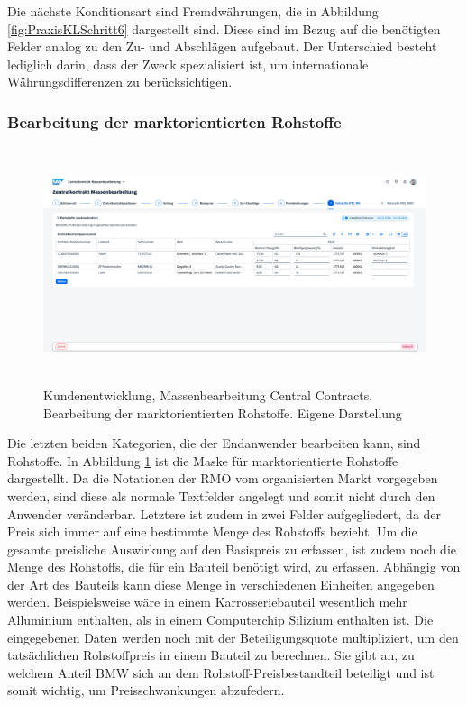 Die nächste Konditionsart sind Fremdwährungen, die in Abbildung \ref{fig:PraxisKLSchritt6} dargestellt sind. Diese sind im Bezug auf die benötigten Felder analog zu den Zu- und Abschlägen aufgebaut. Der Unterschied besteht lediglich darin, dass der Zweck spezialisiert ist, um internationale Währungsdifferenzen zu berücksichtigen.

\subsubsection{Bearbeitung der marktorientierten Rohstoffe}

\begin{figure}[H]
    \centering
    \includegraphics[height=6.91cm]{Bilder/Praxisteil-KL-Schritt-7.png}
    \caption[Kundenentwicklung, Massenbearbeitung Central Contracts, Bearbeitung der marktorientierten Rohstoffe]{Kundenentwicklung, Massenbearbeitung Central Contracts, Bearbeitung der marktorientierten Rohstoffe. Eigene Darstellung}
    \label{fig:PraxisKLSchritt7}
\end{figure}

Die letzten beiden Kategorien, die der Endanwender bearbeiten kann, sind Rohstoffe. In Abbildung \ref{fig:PraxisKLSchritt7} ist die Maske für marktorientierte Rohstoffe dargestellt. Da die Notationen der RMO vom organisierten Markt vorgegeben werden, sind diese als normale Textfelder angelegt und somit nicht durch den Anwender veränderbar. Letztere ist zudem in zwei Felder aufgegliedert, da der Preis sich immer auf eine bestimmte Menge des Rohstoffs bezieht. Um die gesamte preisliche Auswirkung auf den Basispreis zu erfassen, ist zudem noch die Menge des Rohstoffs, die für ein Bauteil benötigt wird, zu erfassen. Abhängig von der Art des Bauteils kann diese Menge in verschiedenen Einheiten angegeben werden. Beispielsweise wäre in einem Karrosseriebauteil wesentlich mehr Alluminium enthalten, als in einem Computerchip Silizium enthalten ist. Die eingegebenen Daten werden noch mit der Beteiligungsquote multipliziert, um den tatsächlichen Rohstoffpreis in einem Bauteil zu berechnen. Sie gibt an, zu welchem Anteil BMW sich an dem Rohstoff-Preisbestandteil beteiligt und ist somit wichtig, um Preisschwankungen abzufedern.

